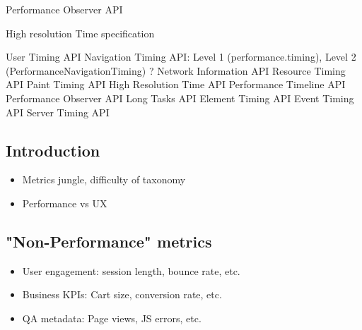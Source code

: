 Performance Observer API %



High resolution Time specification






User Timing API
Navigation Timing API: Level 1 (performance.timing), Level 2 (PerformanceNavigationTiming) ?
Network Information API
Resource Timing API
Paint Timing API
High Resolution Time API
Performance Timeline API
Performance Observer API
Long Tasks API
Element Timing API
Event Timing API
Server Timing API
















\subsection{Introduction}

\begin{itemize}
\item Metrics jungle, difficulty of taxonomy
\item Performance vs UX
\end{itemize}










\subsection{"Non-Performance" metrics}

\begin{itemize}
\item User engagement: session length, bounce rate, etc.
\item Business KPIs: Cart size, conversion rate, etc.
\item QA metadata: Page views, JS errors, etc.
\end{itemize}



